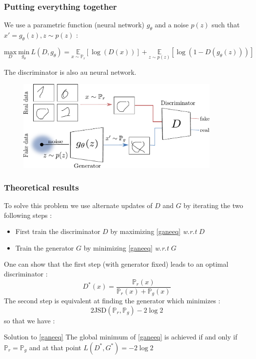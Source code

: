 \documentclass[french,9pt]{beamer}
\begin{document}
\begin{frame}

\frametitle{Putting everything together}

We use a parametric function (neural network) $g_{\theta}$ and a noise $p(z)$ such that $x'=g_{\theta}(z), z \sim p(z)$ :

\begin{equation}
\label{ganeeq}
\underset{D}{\text{max}} \ \underset{g_{\theta}}{\text{min}} \  L(D,g_{\theta}) = \underset{x \sim \mathbb{P}_{r}}{\mathbb{E}}[\log(D(x))]+ \underset{z \sim p(z)}{\mathbb{E}}[\log(1-D(g_{\theta}(z)))]
\end{equation}

The discriminator is also au neural network.

\begin{figure}
  \begin{center}
    \includegraphics[width=0.9\textwidth]{fig/gan.pdf}
  \end{center}
\end{figure}

\end{frame}

\begin{frame}
\frametitle{Theoretical results}

To solve this problem we use alternate updates of $D$ and $G$ by iterating the two following steps :
\begin{itemize}
\item First train the discriminator $D$ by maximizing \eqref{ganeeq} \textit{w.r.t} $D$
\item Train the generator $G$ by minimizing  \eqref{ganeeq} \textit{w.r.t} $G$
\end{itemize}

One can show that the first step (with generator fixed)  leads to an optimal discriminator : $$D^{*}(x)= \frac{\mathbb{P}_{r}(x)}{\mathbb{P}_{r}(x)+\mathbb{P}_{g}(x)}$$ 
The second step is equivalent at finding the generator which minimizes : $$2 \text{JSD}(\mathbb{P}_{r},\mathbb{P}_{g})-2\log 2 $$
 so that we have :
 \begin{block}{Solution to \eqref{ganeeq}}
The global minimum of \eqref{ganeeq} is achieved if and only if $\mathbb{P}_{r}=\mathbb{P}_{g}$ and at that point  $L(D^{*},G^{*})=-2\log 2$
\end{block}

\end{frame}
\end{document}
